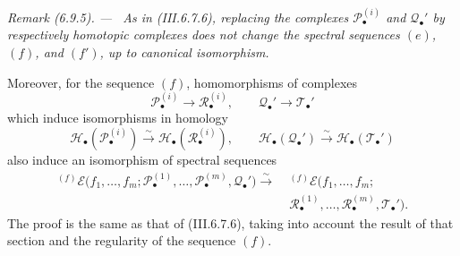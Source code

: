\documentclass[10pt,oneside]{book}
\newcommand{\sh}[1]{\mathscr{#1}}
\newcommand{\sref}[2][]{(#2)}
\newenvironment{remark}[1][]{\par\medskip\noindent\itshape Remark (#1). ---\ }{\par}
\begin{document}
\begin{remark}[6.9.5]
\label{III.6.9.5}
As in \sref{III.6.7.6}, replacing the complexes
$\sh P_\bullet^{(i)}$ and $\sh Q_\bullet'$ by respectively
homotopic complexes does not change the spectral sequences $(e)$,
$(f)$, and $(f')$, up to canonical isomorphism.

Moreover, for the sequence $(f)$, homomorphisms of complexes
\[
  \sh P_\bullet^{(i)}\longrightarrow\sh R_\bullet^{(i)},
  \qquad
  \sh Q_\bullet'\longrightarrow\sh T_\bullet'
\]
which induce isomorphisms in homology
\[
  \sh H_\bullet(\sh P_\bullet^{(i)})
  \xrightarrow{\sim}
  \sh H_\bullet(\sh R_\bullet^{(i)}),
  \qquad
  \sh H_\bullet(\sh Q_\bullet')
  \xrightarrow{\sim}
  \sh H_\bullet(\sh T_\bullet')
\]
also induce an isomorphism of spectral sequences
\[
\begin{split}
  {}^{(f)}\sh E
  \bigl(
    f_1,\ldots,f_m;
    \sh P_\bullet^{(1)},\ldots,\sh P_\bullet^{(m)},
    \sh Q_\bullet'
  \bigr)
  \xrightarrow{\sim}\;&
  {}^{(f)}\sh E
  \bigl(
    f_1,\ldots,f_m;
    \\
    &
    \sh R_\bullet^{(1)},\ldots,\sh R_\bullet^{(m)},
    \sh T_\bullet'
  \bigr).
\end{split}
\]
The proof is the same as that of \sref{III.6.7.6}, taking into
account the result of that section and the regularity of the
sequence $(f)$.
\end{remark}
\end{document}
